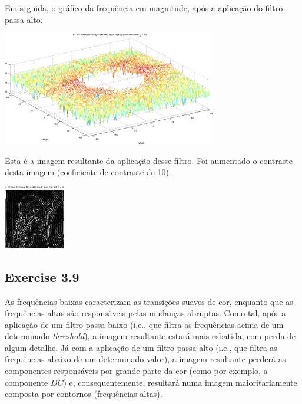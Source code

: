 \documentclass[a4paper]{article}
\begin{document}
\noindent Em seguida, o gráfico da frequência em magnitude, após a aplicação do filtro passa-alto.
\begin{center}
	\includegraphics[width=0.70\textwidth]{images/ex_3_6_highpass.png}
	\label{fig:ex_3_6_highpass}
\end{center}

\clearpage

\noindent Esta é a imagem resultante da aplicação desse filtro. Foi aumentado o contraste desta imagem (coeficiente de contraste de 10).
\begin{center}
	\includegraphics[width=0.20\textwidth]{images/ex_3_8_highpass.png}
	\label{fig:ex_3_8_highpass}
\end{center}

\subsection{Exercise 3.9}
\noindent As frequências baixas caracterizam as transições suaves de cor, enquanto que as frequências altas são responsáveis pelas mudanças abruptas. Como tal, após a aplicação de um filtro passa-baixo (i.e., que filtra as frequências acima de um determinado \emph{threshold}), a imagem resultante estará mais esbatida, com perda de algum detalhe. Já com a aplicação de um filtro passa-alto (i.e., que filtra as frequências abaixo de um determinado valor), a imagem resultante perderá as componentes responsáveis por grande parte da cor (como por exemplo, a componente $DC$) e, consequentemente, resultará numa imagem maioritariamente composta por contornos (frequências altas).
\end{document}
